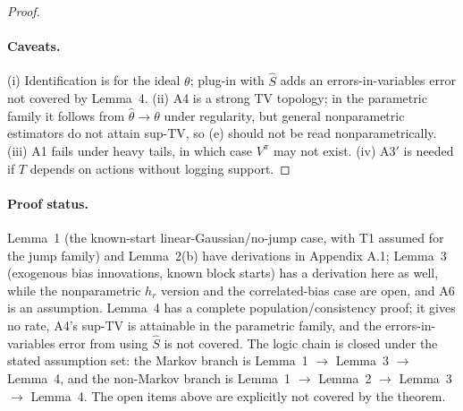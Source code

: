 \begin{proof}
\paragraph{Caveats.}
(i) Identification is for the ideal $\theta$; plug-in with $\hat S$ adds an
errors-in-variables error not covered by Lemma~4.  (ii) A4 is a strong TV
topology; in the parametric family it follows from $\hat\theta\to\theta$ under
regularity, but general nonparametric estimators do not attain sup-TV, so (e)
should not be read nonparametrically.  (iii) A1 fails under heavy tails, in
which case $V^\pi$ may not exist.  (iv) A3$'$ is needed if $T$ depends on
actions without logging support.
\end{proof}

\paragraph{Proof status.}
Lemma~1 (the known-start linear-Gaussian/no-jump case, with T1 assumed for the
jump family) and Lemma~2(b) have derivations in Appendix A.1; Lemma~3 (exogenous
bias innovations, known block starts) has a derivation here as well, while the
nonparametric $h_r$ version and the correlated-bias case are open, and A6 is
an assumption.  Lemma~4 has a complete
population/consistency proof; it gives no rate, A4's sup-TV is attainable in the
parametric family, and the errors-in-variables error from using $\hat S$ is not
covered.  The logic chain is closed under the stated assumption set: the Markov branch is
Lemma~1 $\to$ Lemma~3 $\to$ Lemma~4, and the non-Markov branch is
Lemma~1 $\to$ Lemma~2 $\to$ Lemma~3 $\to$ Lemma~4.  The open items above are
explicitly not covered by the theorem.

\let\theHequation\aItheHequation
